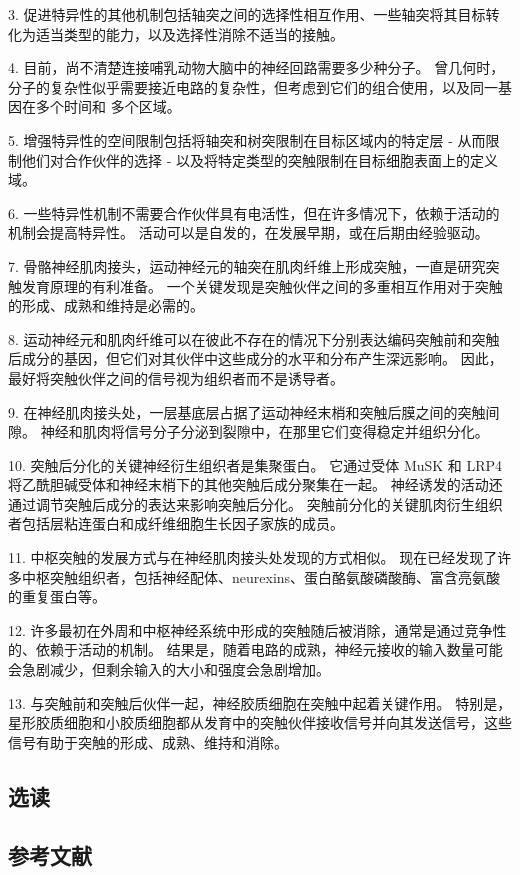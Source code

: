 3. 促进特异性的其他机制包括轴突之间的选择性相互作用、一些轴突将其目标转化为适当类型的能力，以及选择性消除不适当的接触。 

4. 目前，尚不清楚连接哺乳动物大脑中的神经回路需要多少种分子。 曾几何时，分子的复杂性似乎需要接近电路的复杂性，但考虑到它们的组合使用，以及同一基因在多个时间和 多个区域。

5. 增强特异性的空间限制包括将轴突和树突限制在目标区域内的特定层 - 从而限制他们对合作伙伴的选择 - 以及将特定类型的突触限制在目标细胞表面上的定义域。 

6. 一些特异性机制不需要合作伙伴具有电活性，但在许多情况下，依赖于活动的机制会提高特异性。 活动可以是自发的，在发展早期，或在后期由经验驱动。 

7. 骨骼神经肌肉接头，运动神经元的轴突在肌肉纤维上形成突触，一直是研究突触发育原理的有利准备。 一个关键发现是突触伙伴之间的多重相互作用对于突触的形成、成熟和维持是必需的。 

8. 运动神经元和肌肉纤维可以在彼此不存在的情况下分别表达编码突触前和突触后成分的基因，但它们对其伙伴中这些成分的水平和分布产生深远影响。 因此，最好将突触伙伴之间的信号视为组织者而不是诱导者。 

9. 在神经肌肉接头处，一层基底层占据了运动神经末梢和突触后膜之间的突触间隙。 神经和肌肉将信号分子分泌到裂隙中，在那里它们变得稳定并组织分化。 

10. 突触后分化的关键神经衍生组织者是集聚蛋白。 它通过受体 MuSK 和 LRP4 将乙酰胆碱受体和神经末梢下的其他突触后成分聚集在一起。 神经诱发的活动还通过调节突触后成分的表达来影响突触后分化。 突触前分化的关键肌肉衍生组织者包括层粘连蛋白和成纤维细胞生长因子家族的成员。 

11. 中枢突触的发展方式与在神经肌肉接头处发现的方式相似。 现在已经发现了许多中枢突触组织者，包括神经配体、neurexins、蛋白酪氨酸磷酸酶、富含亮氨酸的重复蛋白等。 

12. 许多最初在外周和中枢神经系统中形成的突触随后被消除，通常是通过竞争性的、依赖于活动的机制。 结果是，随着电路的成熟，神经元接收的输入数量可能会急剧减少，但剩余输入的大小和强度会急剧增加。 

13. 与突触前和突触后伙伴一起，神经胶质细胞在突触中起着关键作用。 特别是，星形胶质细胞和小胶质细胞都从发育中的突触伙伴接收信号并向其发送信号，这些信号有助于突触的形成、成熟、维持和消除。


\subsection{选读}
\subsection{参考文献}